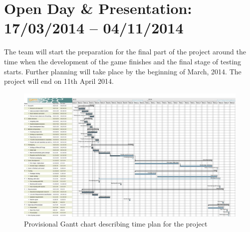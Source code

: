 \section{Open Day \& Presentation: 17/03/2014 -- 04/11/2014}
The team will start the preparation for the final part of the project around the time when the development of the game finishes and the final stage of testing starts. Further planning will take place by the beginning of March, 2014. The project will end on 11th April 2014.

\begin{landscape}
\begin{figure}
\caption{Provisional Gantt chart describing time plan for the project}
\label{fig:gantt}
\includegraphics[width=24cm]{interim_gantt_chart}
\end{figure}
\end{landscape}